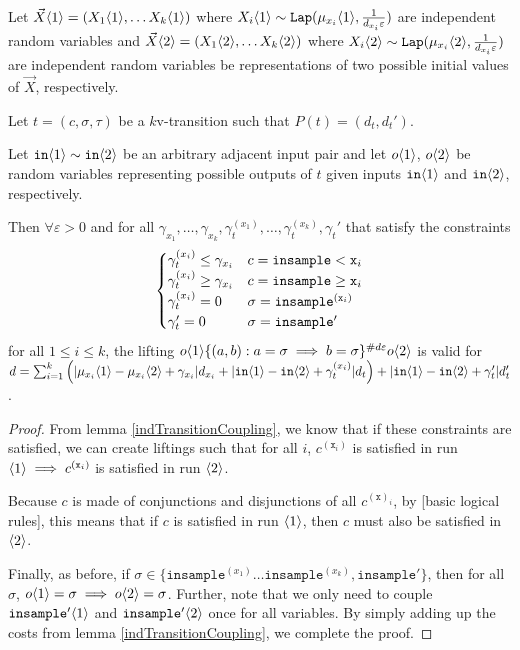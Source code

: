 \begin{lemma}\label{mvParallelCouplingsLemma}
    Let $\vec{X}\brangle{1} = (X_1\brangle{1}, \ldots X_k\brangle{1})$ where $X_i\brangle{1}\sim \Lap(\mu_{x_i}\brangle{1}, \frac{1}{d_{x_i}\varepsilon})$ are independent random variables and $\vec{X}\brangle{2} = (X_1\brangle{2}, \ldots X_k\brangle{2})$ where $X_i\brangle{2}\sim \Lap(\mu_{x_i}\brangle{2}, \frac{1}{d_{x_i}\varepsilon})$ are independent random variables be representations of two possible initial values of $\vec{X}$, respectively.

    Let $t = (c, \sigma, \tau)$ be a $k$v-transition such that $P(t) = (d_t, d_t')$.

    Let $\texttt{in}\brangle{1}\sim\texttt{in}\brangle{2}$ be an arbitrary adjacent input pair and let $o\brangle{1}$, $o\brangle{2}$ be random variables representing possible outputs of $t$ given inputs $\texttt{in}\brangle{1}$ and $\texttt{in}\brangle{2}$, respectively. 

    Then $\forall \varepsilon>0$ and for all $\gamma_{x_1}, \ldots, \gamma_{x_k}, \gamma_t^{(x_1)}, \ldots, \gamma_t^{(x_k)}, \gamma_t'$ that satisfy the constraints \[
        \begin{cases}
            \gamma_t^{(x_i)}\leq\gamma_{x_i} & c = \lguard[\texttt{x}_i]\\
            \gamma_t^{(x_i)}\geq\gamma_{x_i} & c = \gguard[\texttt{x}_i]\\
            \gamma_t^{(x_i)}=0 & \sigma = \texttt{insample}^{(\texttt{x}_i)}\\
            \gamma_t'=0 & \sigma = \texttt{insample}'
      \end{cases}
      \] for all $1\leq i\leq k$, the lifting $o\brangle{1}\{(a, b): a=\sigma\implies b=\sigma\}^{\#d\varepsilon}o\brangle{2}$ is valid for 
      $d = \sum_{i=1}^k\left(|\mu_{x_i}\brangle{1}-\mu_{x_i}\brangle{2}+\gamma_{x_i}|d_{x_i}+|\texttt{in}\brangle{1}-\texttt{in}\brangle{2}+\gamma_t^{(x_i)}|d_t\right)+|\texttt{in}\brangle{1}-\texttt{in}\brangle{2}+\gamma_t'|d_t'$.
\end{lemma}
\begin{proof}
    From lemma \ref{indTransitionCoupling}, we know that if these constraints are satisfied, we can create liftings such that for all $i$, $c^{(\texttt{x}_i)}$ is satisfied in run $\brangle{1}\implies c^{(\texttt{x}_i)}$ is satisfied in run $\brangle{2}$.
    
    Because $c$ is made of conjunctions and disjunctions of all $c^{(\texttt{x})_i}$, by [basic logical rules], this means that if $c$ is satisfied in run $\brangle{1}$, then $c$ must also be satisfied in $\brangle{2}$. 

    Finally, as before, if $\sigma \in \{\texttt{insample}^{(x_1)}\ldots \texttt{insample}^{(x_k)},\texttt{insample}'\}$, then for all $\sigma$, $o\brangle{1}=\sigma \implies o\brangle{2} = \sigma$. Further, note that we only need to couple $\texttt{insample}'\brangle{1}$ and $\texttt{insample}'\brangle{2}$ once for all variables. By simply adding up the costs from lemma \ref{indTransitionCoupling}, we complete the proof.
\end{proof}

